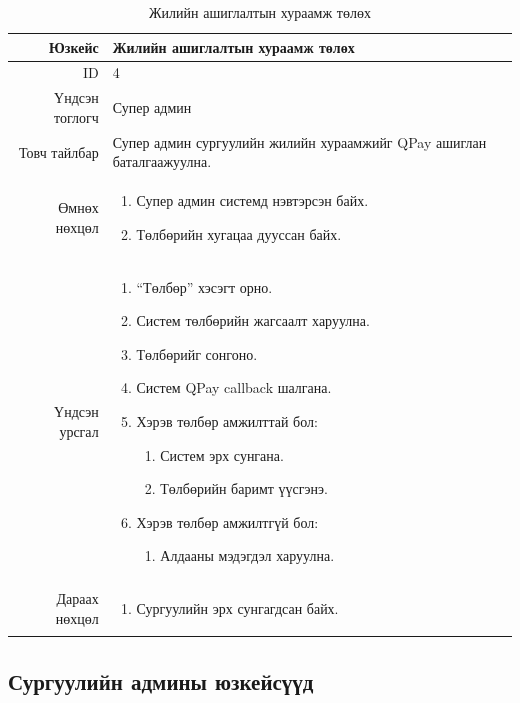 \begin{longtable}{|r|p{11cm}|}
\caption{Жилийн ашиглалтын хураамж төлөх}
\label{table:usecase4}\\ \hline
Юзкейс & Жилийн ашиглалтын хураамж төлөх \\ \hline
ID & 4 \\ \hline
Үндсэн тоглогч & Супер админ \\ \hline
Товч тайлбар & Супер админ сургуулийн
жилийн хураамжийг QPay ашиглан баталгаажуулна.
\\ \hline
Өмнөх нөхцөл &
\begin{enumerate}[nosep]
\item Супер админ системд нэвтэрсэн байх.
\item Төлбөрийн хугацаа дууссан байх.
\end{enumerate} \\ \hline
Үндсэн урсгал &
\begin{enumerate}[nosep]
\item ``Төлбөр'' хэсэгт орно.
\item Систем төлбөрийн жагсаалт харуулна.
\item Төлбөрийг сонгоно.
\item Систем QPay callback шалгана.
\item Хэрэв төлбөр амжилттай бол:
\begin{enumerate}[nosep,label*=\arabic*.]
\item Систем эрх сунгана.
\item Төлбөрийн баримт үүсгэнэ.
\end{enumerate}
\item Хэрэв төлбөр амжилтгүй бол:
\begin{enumerate}[nosep,label*=\arabic*.]
\item Алдааны мэдэгдэл харуулна.
\end{enumerate}
\end{enumerate} \\ \hline
Дараах нөхцөл &
\begin{enumerate}[nosep]
\item Сургуулийн эрх сунгагдсан байх.
\end{enumerate} \\ \hline
\end{longtable}

\subsection*{Сургуулийн админы юзкейсүүд}

